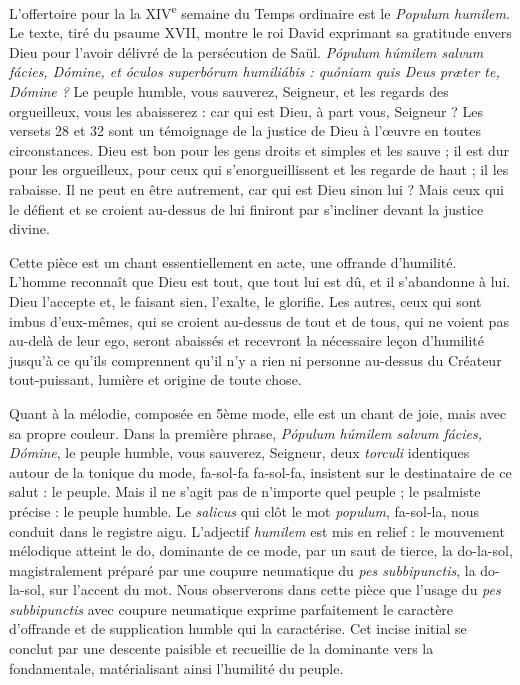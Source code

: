 \documentclass[Session2026.tex]{subfiles}
\begin{document}

L'offertoire pour la la XIV\textsuperscript{e} semaine du Temps ordinaire
est le \emph{Populum
humilem}. Le texte, tiré du psaume XVII, montre le roi David exprimant
sa gratitude envers Dieu pour l'avoir délivré de la persécution de Saül.
\emph{Pópulum húmilem salvum fácies, Dómine, et óculos superbórum
humiliábis : quóniam quis Deus præter te, Dómine ?} Le peuple humble,
vous sauverez, Seigneur, et les regards des orgueilleux, vous les
abaisserez : car qui est Dieu, à part vous, Seigneur ? Les versets 28 et
32 sont un témoignage de la justice de Dieu à l'œuvre en toutes
circonstances. Dieu est bon pour les gens droits et simples et les sauve
; il est dur pour les orgueilleux, pour ceux qui s'enorgueillissent et
les regarde de haut ; il les rabaisse. Il ne peut en être autrement, car
qui est Dieu sinon lui ? Mais ceux qui le défient et se croient
au-dessus de lui finiront par s'incliner devant la justice divine.

Cette pièce est un chant essentiellement en acte, une offrande
d'humilité. L'homme reconnaît que Dieu est tout, que tout lui est dû, et
il s'abandonne à lui. Dieu l'accepte et, le faisant sien, l'exalte, le
glorifie. Les autres, ceux qui sont imbus d'eux-mêmes, qui se croient
au-dessus de tout et de tous, qui ne voient pas au-delà de leur ego,
seront abaissés et recevront la nécessaire leçon d'humilité jusqu'à ce
qu'ils comprennent qu'il n'y a rien ni personne au-dessus du Créateur
tout-puissant, lumière et origine de toute chose.

Quant à la mélodie, composée en 5ème mode, elle est un chant de joie,
mais avec sa propre couleur. Dans la première phrase, \emph{Pópulum
húmilem salvum fácies, Dómine}, le peuple humble, vous sauverez,
Seigneur, deux \emph{torculi} identiques autour de la tonique du mode,
fa-sol-fa fa-sol-fa, insistent sur le destinataire de ce salut : le
peuple. Mais il ne s'agit pas de n'importe quel peuple ; le psalmiste
précise : le peuple humble. Le \emph{salicus} qui clôt le mot
\emph{populum}, fa-sol-la, nous conduit dans le registre aigu.
L'adjectif \emph{humilem} est mis en relief : le mouvement mélodique
atteint le do, dominante de ce mode, par un saut de tierce, la
do-la-sol, magistralement préparé par une coupure neumatique du
\emph{pes subbipunctis}, la do-la-sol, sur l'accent du mot. Nous
observerons dans cette pièce que l'usage du \emph{pes subbipunctis} avec
coupure neumatique exprime parfaitement le caractère d'offrande et de
supplication humble qui la caractérise. Cet incise initial se conclut
par une descente paisible et recueillie de la dominante vers la
fondamentale, matérialisant ainsi l'humilité du peuple.
\end{document}
